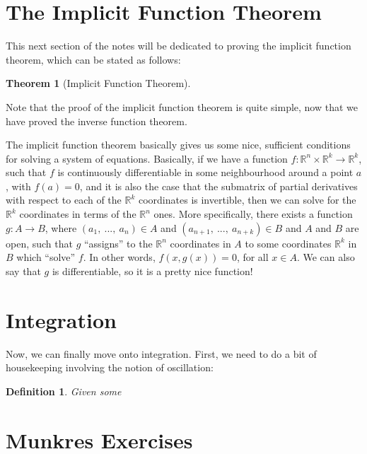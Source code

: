 \documentclass[10pt, oneside]{amsart}
\newtheorem{thm}{Theorem}
\newtheorem{defn}{Definition}
\begin{document}
    \section{The Implicit Function Theorem}

    This next section of the notes will be dedicated to proving the implicit function theorem, which can be stated as follows:

    \begin{thm}[Implicit Function Theorem]

    \end{thm}

    Note that the proof of the implicit function theorem is quite simple, now that we have proved the inverse function theorem.
    \newline

    The implicit function theorem basically gives us some nice, sufficient conditions for solving a system of equations. Basically, if we have a function $f : \mathbb{R}^{n} \times \mathbb{R}^{k} \rightarrow \mathbb{R}^{k}$,
    such that $f$ is continuously differentiable in some neighbourhood around a point $a$, with $f(a) = 0$, and it is also the case that the submatrix of partial derivatives with respect to each of the $\mathbb{R}^{k}$ coordinates
    is invertible, then we can solve for the $\mathbb{R}^{k}$ coordinates in terms of the $\mathbb{R}^{n}$ ones. More specifically, there exists a function $g : A \rightarrow B$, where $(a_1, \ ..., \ a_n) \in A$ and $(a_{n + 1}, \ ..., \ a_{n + k}) \in B$
    and $A$ and $B$ are open, such that $g$ ``assigns'' to the $\mathbb{R}^{n}$ coordinates in $A$ to some coordinates $\mathbb{R}^{k}$ in $B$ which ``solve'' $f$. In other words, $f(x, g(x)) = 0$, for all $x \in A$. We can also say that
    $g$ is differentiable, so it is a pretty nice function!

    \section{Integration}

    Now, we can finally move onto integration. First, we need to do a bit of housekeeping involving the notion of oscillation:

    \begin{defn}
      Given some 
      \end{defn}

    \section{Munkres Exercises}
\end{document}
